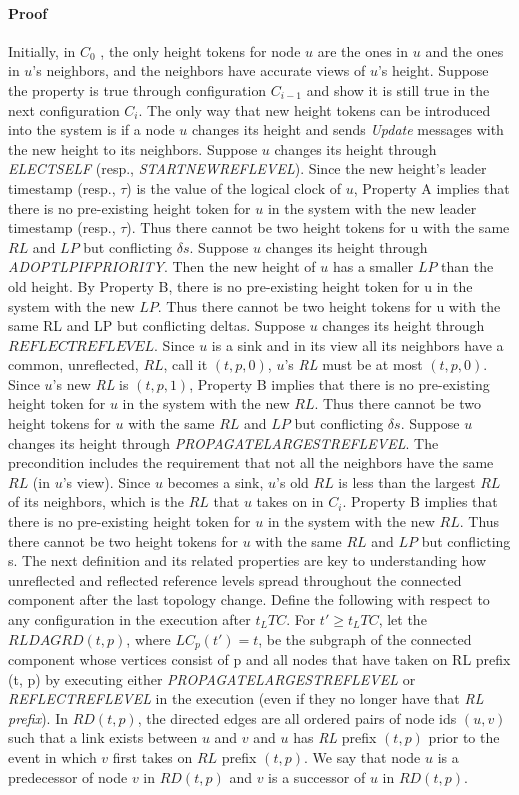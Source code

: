 \documentclass{article}
\begin{document}
\paragraph{Proof}
Initially, in $C_0$ , the only height tokens for node $u$ are the ones in $u$ and the ones in $u$’s neighbors, and the neighbors have accurate views of $u$’s height. Suppose the property is true through configuration $C_{i − 1}$ and show it is still true in the next configuration $C_i$. The only way that new height tokens can be introduced into the system is if a node $u$ changes its height and sends \textit{Update} messages with the new height to its neighbors. Suppose $u$ changes its height through \textit{ELECTSELF} (resp., \textit{STARTNEWREFLEVEL}). Since the new height’s leader timestamp (resp., $\tau $) is the value of the logical clock of $u$, Property A implies that there is no pre-existing height token for $u$ in the system with the new leader timestamp (resp., $\tau $).
Thus there cannot be two height tokens for u with the same $RL$ and $LP$ but conflicting $\delta s$.
Suppose $u$ changes its height through \textit{ADOPTLPIFPRIORITY}. Then the new height of $u$ has a smaller $LP$ than the old height. By Property B, there is no pre-existing height token for u in the system with the new $LP$. Thus there cannot be two height tokens for u with the same RL and LP but conflicting deltas.
Suppose $u$ changes its height through $REFLECTREFLEVEL$. Since $u$ is a sink and in its view all its neighbors have a common, unreflected, $RL$, call it $(t, p, 0)$, $u$’s \textit{RL} must be at most $(t, p, 0)$. Since $u$’s new \textit{RL} is $(t, p, 1)$, Property B implies that there is no pre-existing height token for $u$ in the system with the new $RL$. Thus there cannot be two height tokens for $u$ with the same $RL$ and $LP$ but conflicting $\delta s$. Suppose $u$ changes its height through \textit{PROPAGATELARGESTREFLEVEL}. The precondition includes the requirement that not all the neighbors have the same $RL$ (in $u$’s view). Since $u$ becomes a sink, $u$’s old $RL$ is less than the largest $RL$ of its neighbors, which is the $RL$ that $u$ takes on in $C_i$. Property B implies that there is no pre-existing height token for $u$ in the system with the new $RL$. Thus there cannot be two height tokens for $u$ with the same $RL$ and $LP$ but conflicting \delta s. The next definition and its related properties are key to understanding how unreflected and reflected reference levels spread throughout the connected component after the last topology change. Define the following with respect to any configuration in the execution after $t_LTC$. For $t' \geq t_LTC$, let the $RL DAG RD(t, p)$, where $LC_p (t') = t$, be the subgraph of the connected component whose vertices consist of p and all nodes that have taken on RL prefix (t, p) by executing either \textit{PROPAGATELARGESTREFLEVEL} or \textit{REFLECTREFLEVEL} in the execution (even if they no longer have that \textit{RL prefix}). In $RD(t, p)$, the directed edges are all ordered pairs of node ids $(u, v)$ such that a link exists between $u$ and $v$ and $u$ has \textit{RL} prefix $(t, p)$ prior to the event in which $v$ first takes on $RL$ prefix $(t, p)$. We say that node $u$ is a predecessor of node $v$ in $RD(t, p)$ and $v$ is a successor of $u$ in $RD(t, p)$.
\end{document}
